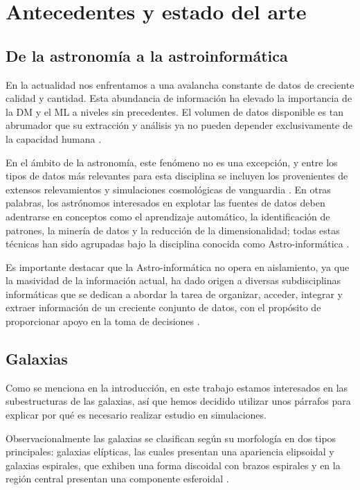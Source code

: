 \chapter{Antecedentes y estado del arte}
\label{chapter:antecedentes}

\section{De la astronomía a la astroinformática}

En la actualidad nos enfrentamos a una avalancha constante de datos de creciente calidad y cantidad. Esta abundancia de información ha elevado la importancia de la \gls{DM} y el \gls{ML} a niveles sin precedentes. El volumen de datos disponible es tan abrumador que su extracción y análisis ya no pueden depender exclusivamente de la capacidad humana \citep{hey2009fourth}. 

En el ámbito de la astronomía, este fenómeno no es una excepción, y entre los tipos de datos más relevantes para esta disciplina se incluyen los provenientes de extensos relevamientos \citep{shen2003size} y simulaciones cosmológicas de vanguardia \citep{pillepich2018simulating, schaye2015eagle}. En otras palabras, los astrónomos interesados en explotar las fuentes de datos deben adentrarse en conceptos como el aprendizaje automático, la identificación de patrones, la minería de datos y la reducción de la dimensionalidad; todas estas técnicas han sido agrupadas bajo la  disciplina conocida como Astro-informática \citep{borne_astroinformatics:_2010}.

Es importante destacar que la Astro-informática no opera en aislamiento, ya que la masividad de la información actual, ha dado origen a diversas subdisciplinas informáticas que se dedican a abordar la tarea de organizar, acceder, integrar y extraer información de un creciente conjunto de datos, con el propósito de proporcionar apoyo en la toma de decisiones \citep{fox2011rise}.

\section{Galaxias}

Como se menciona en la introducción, en este trabajo estamos interesados en las subestructuras de las galaxias, así que hemos decidido utilizar unos párrafos para explicar por qué es necesario realizar estudio en simulaciones.

Observacionalmente las galaxias se clasifican según su morfología en dos tipos principales:  galaxias elípticas, las cuales presentan una apariencia elipsoidal y galaxias espirales, que exhiben una forma discoidal con brazos espirales y en la región central presentan una componente esferoidal \cite{hubble1936realm}.

